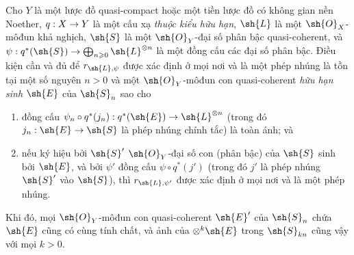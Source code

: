 \documentclass[oneside,10pt]{amsart}
\makeatletter
\renewcommand{\geq}{\geqslant}
\newcommand{\ega@arrow}[2]{\mathchoice{#1}{#2}{#2}{#2}}
\renewcommand{\to}{\ega@arrow{\longrightarrow}{\rightarrow}}
\let\EGAOriginalLabel\label
\renewcommand{\label}[1]{\phantomsection\EGAOriginalLabel{#1}}
\makeatother
\begin{document}
\begin{proposition}[3.8.5]
\label{II.3.8.5}
Cho $Y$ là một lược đồ quasi-compact hoặc một tiền lược đồ có không gian nền Noether, $q:X\to Y$ là một cấu xạ \emph{thuộc kiểu hữu hạn}, $\sh{L}$ là một $\sh{O}_X$-môđun khả nghịch, $\sh{S}$ là một $\sh{O}_Y$-đại số phân bậc quasi-coherent, và $\psi:q^*(\sh{S})\to\bigoplus_{n\geq0}\sh{L}^{\otimes n}$ là một đồng cấu các đại số phân bậc.
Điều kiện cần và đủ để $r_{\sh{L},\psi}$ được xác định ở mọi nơi và là một phép nhúng là tồn tại một số nguyên $n>0$ và một $\sh{O}_Y$-môđun con quasi-coherent \emph{hữu hạn sinh} $\sh{E}$ của $\sh{S}_n$ sao cho
\begin{enumerate}
  \item[a)] đồng cấu $\psi_n\circ q^*(j_n):q^*(\sh{E})\to\sh{L}^{\otimes n}$ (trong đó $j_n:\sh{E}\to\sh{S}$ là phép nhúng chính tắc) là toàn ánh; và
  \item[b)] nếu ký hiệu bởi $\sh{S}'$ $\sh{O}_Y$-đại số con (phân bậc) của $\sh{S}$ sinh bởi $\sh{E}$, và bởi $\psi'$ đồng cấu $\psi\circ q^*(j')$ (trong đó $j'$ là phép nhúng $\sh{S}'$ vào $\sh{S}$), thì $r_{\sh{L},\psi'}$ được xác định ở mọi nơi và là một phép nhúng.
\end{enumerate}

Khi đó, mọi $\sh{O}_Y$-môđun con quasi-coherent $\sh{E}'$ của $\sh{S}_n$ chứa $\sh{E}$ cũng có cùng tính chất, và ảnh của $\otimes^k\sh{E}$ trong $\sh{S}_{kn}$ cũng vậy với mọi $k>0$.
\end{proposition}
\end{document}
